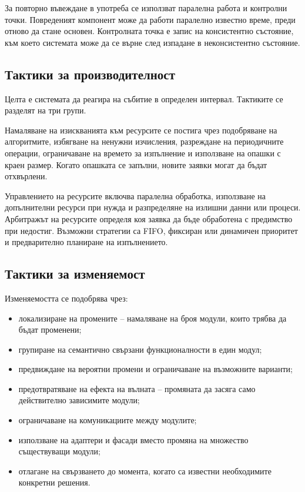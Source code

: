 За повторно въвеждане в употреба се използват паралелна работа и контролни точки. Повреденият компонент може да работи паралелно известно време, преди отново да стане основен. Контролната точка е запис на консистентно състояние, към което системата може да се върне след изпадане в неконсистентно състояние.

\subsection{Тактики за производителност}\label{s:27.7.2}

Целта е системата да реагира на събитие в определен интервал. Тактиките се разделят на три групи.

Намаляване на изискванията към ресурсите се постига чрез подобряване на алгоритмите, избягване на ненужни изчисления, разреждане на периодичните операции, ограничаване на времето за изпълнение и използване на опашки с краен размер. Когато опашката се запълни, новите заявки могат да бъдат отхвърлени.

Управлението на ресурсите включва паралелна обработка, използване на допълнителни ресурси при нужда и разпределяне на излишни данни или процеси. Арбитражът на ресурсите определя коя заявка да бъде обработена с предимство при недостиг. Възможни стратегии са FIFO, фиксиран или динамичен приоритет и предварително планиране на изпълнението.

\subsection{Тактики за изменяемост}\label{s:27.7.3}

Изменяемостта се подобрява чрез:

\begin{itemize}
    \item локализиране на промените -- намаляване на броя модули, които трябва да бъдат променени;
    \item групиране на семантично свързани функционалности в един модул;
    \item предвиждане на вероятни промени и ограничаване на възможните варианти;
    \item предотвратяване на ефекта на вълната -- промяната да засяга само действително зависимите модули;
    \item ограничаване на комуникациите между модулите;
    \item използване на адаптери и фасади вместо промяна на множество съществуващи модули;
    \item отлагане на свързването до момента, когато са известни необходимите конкретни решения.
\end{itemize}

